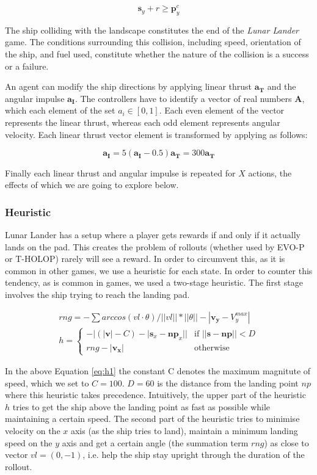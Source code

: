 \documentclass[conference]{IEEEtran}
\newcommand{\twopartdef}[4]
{
	\left\{
		\begin{array}{ll}
			#1 & \mbox{if } #2 \\
			#3 & \mbox{otherwise } 
		\end{array}
	\right.
}
\begin{document}
\begin{equation}
\boldsymbol {s}_{y} + r \geq \boldsymbol {p}^{c}_{y}
\end{equation}

The ship colliding with the landscape constitutes the end of the {\itshape Lunar Lander} game. The conditions surrounding this collision, including speed, orientation of the ship, and fuel used, constitute whether the nature of the collision is a success or a failure.

An agent can modify the ship directions by applying linear thrust $\bm{a_T}$ and the angular impulse $\bm{a_I}$. The controllers have to identify a vector of real numbers $\bm{A}$, which each element of the set $a_i \in [0,1]$. Each even element of the vector represents the linear thrust, whereas each odd element represents angular velocity. Each linear thrust vector element is transformed by applying as follows: 

\begin{equation}
\bm{a_I} = 5(\bm{a_I} - 0.5)
\bm{a_T} = 300\bm{a_T} 
\end{equation}

Finally each linear thrust and angular impulse is repeated for $X$ actions, the effects of which we are going to explore below. 

\subsubsection{Heuristic} %

Lunar Lander has a setup where a player gets rewards if and only if it actually lands on the pad. This creates the problem of rollouts (whether used by EVO-P or T-HOLOP) rarely will see a reward. In order to circumvent this, as it is common in other games, we use a heuristic for each state. In order to counter this tendency, as is common in games, we used a two-stage heuristic. The first stage involves the ship trying to reach the landing pad. 


\begin{multline}
rng = -\sum{arccos(vl\cdot\theta)/||vl||*||\theta||} - |\boldsymbol {v_y} - V_{y}^{max}| \\
h = \twopartdef{ -|(|\boldsymbol {v}| - C) - |\boldsymbol {s}_{x} - \boldsymbol {np}_{x}||}{||\boldsymbol {s} - \boldsymbol {np}|| < D}
{rng - |\boldsymbol {v_x}|   }{Otherwise}
\label{eq:h1}
\end{multline}

In the above Equation \ref{eq:h1} the constant C denotes the maximum magnitute of speed, which we set to $C=100$. $D = 60$ is the distance from the landing point $np$ where this heuristic takes precedence.  Intuitively, the upper part of the heuristic $h$ tries to get the ship above the landing point as fast as possible while maintaining a certain speed. The second part of the heuristic tries to minimise velocity on the $x$ axis (as the ship tries to land), maintain a minimum landing speed on the $y$ axis and get a certain angle (the summation term $rng$) as close to vector $vl = (0,-1)$, i.e. help the ship stay upright through the duration of the rollout.  
\end{document}

